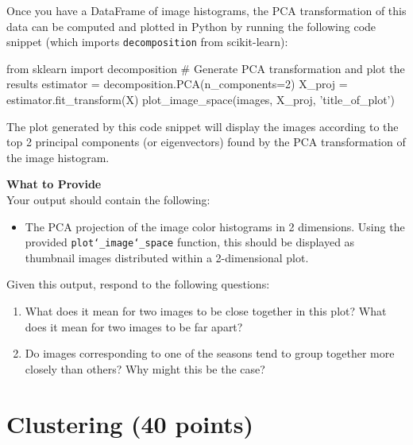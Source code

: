 \documentclass[paper=a4, fontsize=11pt]{scrartcl} %
\numberwithin{equation}{section} %
\numberwithin{figure}{section} %
\numberwithin{table}{section} %
\begin{document}
\vspace{6pt}

Once you have a DataFrame of image histograms, the PCA transformation of this data can be computed and plotted in Python by running the following code snippet (which imports \texttt{decomposition} from scikit-learn):

\vspace{6pt}

\begin{adjustbox}{minipage=0.8\textwidth,margin=0pt \smallskipamount,center}
\begin{python}
from sklearn import decomposition
# Generate PCA transformation and plot the results
estimator = decomposition.PCA(n_components=2)
X_proj = estimator.fit_transform(X)
plot_image_space(images, X_proj, 'title_of_plot')
\end{python}
\end{adjustbox}

\vspace{6pt}

The plot generated by this code snippet will display the images according to the top 2 principal components (or eigenvectors) found by the PCA transformation of the image histogram. %

\vspace{8pt}

\textbf{What to Provide}\\
Your output should contain the following:
\begin{itemize}
\item The PCA projection of the image color histograms in 2 dimensions. Using the provided \texttt{plot\char`_image\char`_space} function, this should be displayed as thumbnail images distributed within a 2-dimensional plot.
\end{itemize}
Given this output, respond to the following questions:
\begin{enumerate}
\item What does it mean for two images to be close together in this plot? What does it mean for two images to be far apart?
\item Do images corresponding to one of the seasons tend to group together more closely than others? Why might this be the case?
\end{enumerate}


\newpage
\section{Clustering (40 points)}
\end{document}
